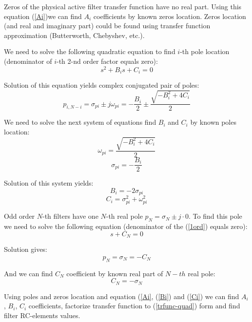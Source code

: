 Zeros of the physical active filter transfer function have no real part.
Using this equation (\ref{Ai})we can find $A_i$ coefficients by known zeros
location. Zeros location (and real and imaginary part) could be found using
transfer function approximation (Butterworth, Chebyshev, etc.).

We need to solve the following quadratic equation to find $i$-th pole location
(denominator of $i$-th 2-nd order factor equals zero):
\begin{equation}
 s^2+B_is + C_i = 0
\end{equation}

Solution of this equation yields complex conjugated pair of poles:
\begin{equation}
 p_{i,N-i}=\sigma_{pi}\pm
j\omega_{pi}=-\frac{B_i}{2}\pm\frac{\sqrt{-B_i^2+4C_i}}{2}
\label{pole_from_quad}
\end{equation}

We need to solve the next system of equations find $B_i$ and $C_i$ by known
poles location:
\begin{equation}
 \omega_{pi}=\frac{\sqrt{-B_i^2+4C_i}}{2}
\end{equation}
\begin{equation}
 \sigma_{pi}=-\frac{B_i}{2}
\end{equation}

Solution of this system yields:
\begin{equation}
 B_i=-2\sigma_{pi} \label{Bi}
\end{equation}
\begin{equation}
 C_i=\sigma_{pi}^2+\omega_{pi}^2 \label{Ci}
\end{equation}

Odd order $N$-th filters have one $N$-th real pole $p_N=\sigma_{N}\pm j\cdot0$.
To find this pole we need to solve the following equation (denominator of the
(\ref{1ord}) equals zero):
\begin{equation}
 s+C_N=0
\end{equation}

Solution gives:
\begin{equation}
 p_N =\sigma_N = -C_N
\end{equation}

And we can find $C_N$ coefficient by known real part of $N-th$ real pole:
\begin{equation}
 C_N=-\sigma_N \label{CN-1ord}
\end{equation}

Using poles and zeros location and equation (\ref{Ai}, (\ref{Bi}) and
(\ref{Ci}) we can find $A_i$, $B_i$, $C_i$ coefficients, factorize transfer
function to (\ref{trfunc-quad}) form and find filter RC-elements values.

